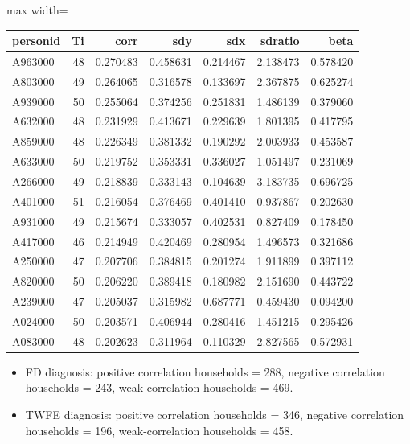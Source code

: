 \documentclass[a4paper,11pt]{article}
\renewcommand{\_}{\textunderscore\allowbreak}
\renewcommand{\arraystretch}{1.25}
\providecommand{\tightlist}{%
  \setlength{\itemsep}{0pt}\setlength{\parskip}{0pt}}
\begin{document}
\begin{center}
\begingroup
\footnotesize
\setlength{\tabcolsep}{4pt}
\renewcommand{\arraystretch}{1.22}
\begin{adjustbox}{max width=\textwidth}
\begin{tabular}{@{}lrrrrrr@{}}
\toprule
personid & T\_i & corr & sd\_y & sd\_x & sd\_ratio & beta \\
\midrule
A963000 & 48 & 0.270483 & 0.458631 & 0.214467 & 2.138473 & 0.578420 \\
A803000 & 49 & 0.264065 & 0.316578 & 0.133697 & 2.367875 & 0.625274 \\
A939000 & 50 & 0.255064 & 0.374256 & 0.251831 & 1.486139 & 0.379060 \\
A632000 & 48 & 0.231929 & 0.413671 & 0.229639 & 1.801395 & 0.417795 \\
A859000 & 48 & 0.226349 & 0.381332 & 0.190292 & 2.003933 & 0.453587 \\
A633000 & 50 & 0.219752 & 0.353331 & 0.336027 & 1.051497 & 0.231069 \\
A266000 & 49 & 0.218839 & 0.333143 & 0.104639 & 3.183735 & 0.696725 \\
A401000 & 51 & 0.216054 & 0.376469 & 0.401410 & 0.937867 & 0.202630 \\
A931000 & 49 & 0.215674 & 0.333057 & 0.402531 & 0.827409 & 0.178450 \\
A417000 & 46 & 0.214949 & 0.420469 & 0.280954 & 1.496573 & 0.321686 \\
A250000 & 47 & 0.207706 & 0.384815 & 0.201274 & 1.911899 & 0.397112 \\
A820000 & 50 & 0.206220 & 0.389418 & 0.180982 & 2.151690 & 0.443722 \\
A239000 & 47 & 0.205037 & 0.315982 & 0.687771 & 0.459430 & 0.094200 \\
A024000 & 50 & 0.203571 & 0.406944 & 0.280416 & 1.451215 & 0.295426 \\
A083000 & 48 & 0.202623 & 0.311964 & 0.110329 & 2.827565 & 0.572931 \\
\bottomrule
\end{tabular}
\end{adjustbox}
\endgroup
\end{center}


\begin{itemize}
\tightlist
\item
  FD diagnosis: positive correlation households = 288, negative
  correlation households = 243, weak-correlation households = 469.
\item
  TWFE diagnosis: positive correlation households = 346, negative
  correlation households = 196, weak-correlation households = 458.
\end{itemize}
\end{document}

